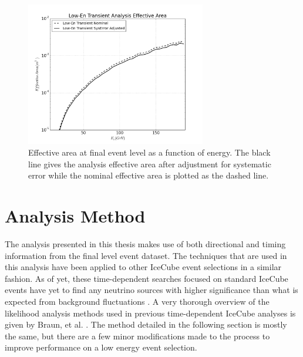 \documentclass{gatech-thesis}
\begin{document}
\begin{figure}[ht]
  \begin{center}
    \includegraphics[width=0.7\textwidth,keepaspectratio]{LowEnTransient_EffArea_GENIE_WithSystematicAdjustedArea.png}
  \end{center}
  \caption[Final Level Neutrino Effective Area with Systematic Error Adjustment]{Effective area at final event level as a function of energy. The black line gives the analysis effective area after adjustment for systematic error while the nominal effective area is plotted as the dashed line.}
  \label{fig:SysAreaWithNom}
\end{figure}

\chapter{Analysis Method}

The analysis presented in this thesis makes use of both directional and timing information from the final level event dataset. The techniques that are used in this analysis have been applied to other IceCube event selections in a similar fashion. As of yet, these time-dependent searches focused on standard IceCube events have yet to find any neutrino sources with higher significance than what is expected from background fluctuations \cite{2012ApJ...744....1A}. A very thorough overview of the likelihood analysis methods used in previous time-dependent IceCube analyses is given by Braun, et al. \cite{2010APh....33..175B}. The method detailed in the following section is mostly the same, but there are a few minor modifications made to the process to improve performance on a low energy event selection.
\end{document}

